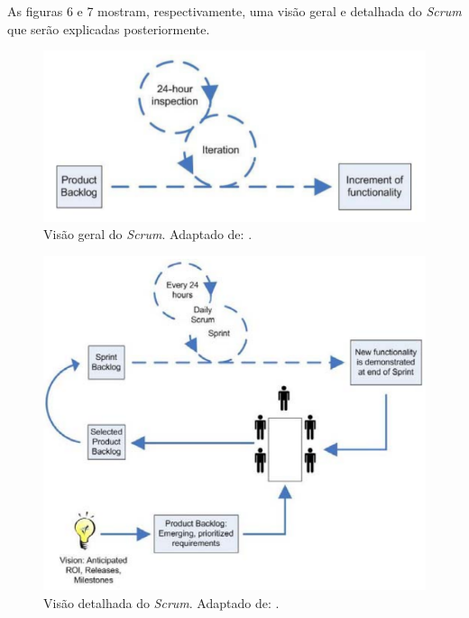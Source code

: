 As figuras 6 e 7 mostram, respectivamente, uma visão geral e detalhada do \textit{Scrum} que serão explicadas posteriormente.

\begin{figure}[!htb]
	\centering
		\includegraphics[scale=0.7]{figuras/scrum}
	\caption{Visão geral do \textit{Scrum}. Adaptado de: \cite{scrum2005}.}
\end{figure}

\begin{figure}[!htb]
	\centering
		\includegraphics[scale=0.7]{figuras/scrum_detalhado}
	\caption{Visão detalhada do \textit{Scrum}. Adaptado de: \cite{scrum2005}.}
\end{figure}
\clearpage

